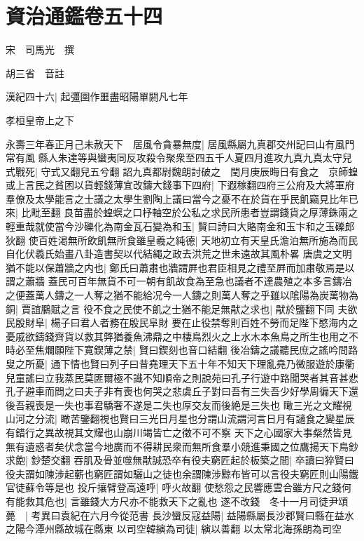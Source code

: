 \section{資治通鑑卷五十四}
宋　司馬光　撰

胡三省　音註

漢紀四十六|{
	起彊圉作噩盡昭陽單閼凡七年}


孝桓皇帝上之下

永壽三年春正月己未赦天下　居風令貪暴無度|{
	居風縣屬九真郡交州記曰山有風門常有風}
縣人朱達等與蠻夷同反攻殺令聚衆至四五千人夏四月進攻九真九真太守兒式戰死|{
	守式又翻兒五兮翻}
詔九真都尉魏朗討破之　閏月庚辰晦日有食之　京師蝗　或上言民之貧困以貨輕錢薄宜改鑄大錢事下四府|{
	下遐稼翻四府三公府及大將軍府}
羣僚及太學能言之士議之太學生劉陶上議曰當今之憂不在於貨在乎民飢竊見比年已來|{
	比毗至翻}
良苗盡於蝗螟之口杼軸空於公私之求民所患者豈謂錢貨之厚薄銖兩之輕重哉就使當今沙礫化為南金瓦石變為和玉|{
	賢曰詩曰大賂南金和玉卞和之玉礫郎狄翻}
使百姓渇無所飲飢無所食雖皇羲之純德|{
	天地初立有天皇氏澹泊無所施為而民自化伏羲氏始畫八卦造書契以代結繩之政去洪荒之世未遠故其風朴畧}
唐虞之文明猶不能以保蕭牆之内也|{
	鄭氏曰蕭肅也牆謂屛也君臣相見之禮至屛而加肅敬焉是以謂之蕭牆}
蓋民可百年無貨不可一朝有飢故食為至急也議者不達農殖之本多言鑄冶之便蓋萬人鑄之一人奪之猶不能給况今一人鑄之則萬人奪之乎雖以隂陽為炭萬物為銅|{
	賈誼鵩賦之言}
役不食之民使不飢之士猶不能足無猒之求也|{
	猒於鹽翻下同}
夫欲民殷財阜|{
	楊子曰君人者務在殷民阜財}
要在止役禁奪則百姓不勞而足陛下愍海内之憂戚欲鑄錢齊貨以救其弊猶養魚沸鼎之中棲鳥烈火之上水木本魚鳥之所生也用之不時必至焦爛願陛下寛鍥薄之禁|{
	賢曰鍥刻也音口結翻}
後冶鑄之議聽民庶之謠吟問路叟之所憂|{
	通下情也賢曰列子曰昔堯理天下五十年不知天下理亂堯乃微服遊於康衢兒童謠曰立我蒸民莫匪爾極不識不知順帝之則說苑曰孔子行遊中路聞哭者其音甚悲孔子避車而問之曰夫子非有喪也何哭之悲虞丘子對曰吾有三失吾少好學周徧天下還後吾親喪是一失也事君驕奢不遂是二失也厚交友而後絶是三失也}
瞰三光之文耀視山河之分流|{
	瞰苦鑒翻視也賢曰三光日月星也分謂山流謂河言日月有讁食之變星辰有錯行之異故視其文耀也山崩川竭皆亡之徵不可不察}
天下之心國家大事粲然皆見無有遺惑者矣伏念當今地廣而不得耕民衆而無所食羣小競進秉國之位鷹揚天下鳥鈔求飽|{
	鈔楚交翻}
吞肌及骨並噬無猒誠恐卒有役夫窮匠起於板築之間|{
	卒讀曰猝賢曰役夫謂如陳涉起蘄也窮匠謂如驪山之徒也余謂陳涉黥布皆可以言役夫窮匠則山陽鐵官徒蘇令等是也}
投斤攘臂登高遠呼|{
	呼火故翻}
使愁怨之民響應雲合雖方尺之錢何有能救其危也|{
	言雖錢大方尺亦不能救天下之亂也}
遂不改錢　冬十一月司徒尹頌薨　|{
	考異曰袁紀在六月今從范書}
長沙蠻反寇益陽|{
	益陽縣屬長沙郡賢曰縣在益水之陽今潭州縣故城在縣東}
以司空韓縯為司徒|{
	縯以善翻}
以太常北海孫朗為司空

